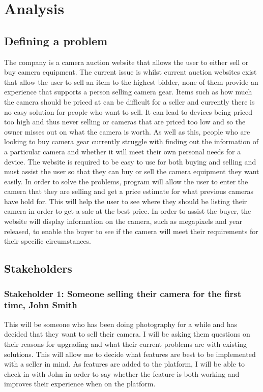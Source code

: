 \chapter{Analysis}
\section{Defining a problem}
The company is a camera auction website that allows the user to either sell or buy camera equipment. The current issue is whilst current auction websites exist that allow the user to sell an item to the highest bidder, none of them provide an experience that supports a person selling camera gear. Items such as how much the camera should be priced at can be difficult for a seller and currently there is no easy solution for people who want to sell. It can lead to devices being priced too high and thus never selling or cameras that are priced too low and so the owner misses out on what the camera is worth. As well as this, people who are looking to buy camera gear currently struggle with finding out the information of a particular camera and whether it will meet their own personal needs for a device.
The website is required to be easy to use for both buying and selling and must assist the user so that they can buy or sell the camera equipment they want easily. In order to solve the problems, program will allow the user to enter the camera that they are selling and get a price estimate for what previous cameras have hold for. This will help the user to see where they should be listing their camera in order to get a sale at the best price. In order to assist the buyer, the website will display information on the camera, such as megapixels and year released, to enable the buyer to see if the camera will meet their requirements for their specific circumstances.

\section{Stakeholders}
\subsection{Stakeholder 1: Someone selling their camera for the first time, John Smith}
This will be someone who has been doing photography for a while and has decided that they want to sell their camera. I will be asking them questions on their reasons for upgrading and what their current problems are with existing solutions. This will allow me to decide what features are best to be implemented with a seller in mind. As features are added to the platform, I will be able to check in with John in order to say whether the feature is both working and improves their experience when on the platform.
